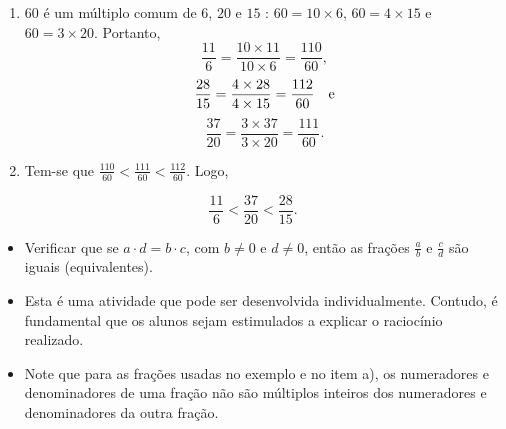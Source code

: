 \begin{multicols}{2}
\begin{orientacoes}{}{}



\end{orientacoes}

\begin{solucao}{}{}
\begin{enumerate} [\quad a)] %
    \item             $60$       é um múltiplo comum de       $6$,       $20$
   e       $15$      :       $60 = 10 \times 6$,       $60 = 4 \times 15$
e       $60 = 3 \times 20$. Portanto,       $$\frac{11}{6} = \frac{10 \times
11}{10 \times 6} = \frac{110}{60},$$             $$\frac{28}{15} = \frac{4
\times 28}{4 \times 15} = \frac{112}{60} \quad {\rm  e}$$
$$\frac{37}{20} = \frac{3 \times 37}{3 \times 20} = \frac{111}{60}.$$
\mbox{} \newline
    \item       Tem-se que       $\frac{110}{60} < \frac{111}{60} <
\frac{112}{60}$. Logo,
\end{enumerate} %

  $$\frac{11}{6} < \frac{37}{20} < \frac{28}{15}.$$
\end{solucao}


\begin{objetivos}[label=chap4-ativ19]{}{}
\begin{itemize} %
    \item       Verificar que se       $a \cdot d = b \cdot c$, com       $b
\not = 0$       e       $d \not = 0$, então as frações       $\frac{a}{b}$
e       $\frac{c}{d}$       são iguais (equivalentes).
\end{itemize} %
\end{objetivos}

\begin{orientacoes}{}{}

\begin{itemize} %
    \item       Esta é uma atividade que pode ser desenvolvida individualmente.
Contudo, é fundamental que os alunos sejam estimulados a explicar o raciocínio
realizado.
    \item       Note que para as frações usadas no exemplo e no item a), os
numeradores e denominadores de uma fração não são múltiplos inteiros dos
numeradores e denominadores da outra fração.
\end{itemize} %



\end{orientacoes}
\end{multicols}
